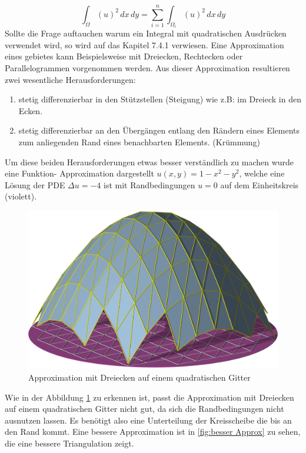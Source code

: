 \begin{equation}
\int_{\Omega} (u)^2 \, dx \, dy = \sum \limits_{i=1}^n \int_{\Omega_i} (u)^2 \, dx \, dy 
\label{fem:equationSummGebiete}
\end{equation}
Sollte die Frage auftauchen warum ein Integral mit quadratischen Ausdrücken verwendet wird, so wird auf das Kapitel 7.4.1 verwiesen. Eine Approximation eines gebietes kann Beispielsweise mit Dreiecken, Rechtecken oder Parallelogrammen vorgenommen werden. Aus dieser Approximation resultieren zwei wesentliche Herausforderungen:
\begin{enumerate}
	\item stetig differenzierbar in den Stützstellen (Steigung) wie z.B: im Dreieck in den Ecken.
	\item stetig differenzierbar an den Übergängen entlang den Rändern eines Elements zum anliegenden Rand eines benachbarten Elements. (Krümmung)
\end{enumerate}
Um diese beiden Herausforderungen etwas besser verständlich zu machen wurde  eine Funktion- Approximation dargestellt  $u(x,y) = 1-x^2-y^2$, welche eine Lösung der PDE $\Delta u = -4$ ist mit Randbedingungen $u=0$ auf dem Einheitskreis (violett).
\begin{figure}[h]
	\centering
	\includegraphics[scale=0.8]{papers/fem/Images/ansatz.jpg}
	\caption{Approximation mit Dreiecken auf einem quadratischen Gitter }
	\label{fig:Ansatz}
\end{figure}
Wie in der Abbildung \ref{fig:Ansatz} zu erkennen ist, passt die Approximation mit Dreiecken auf einem quadratischen Gitter nicht gut, da sich die Randbedingungen nicht ausnutzen lassen. Es benötigt also eine Unterteilung der Kreisscheibe die bis an den Rand kommt. Eine bessere Approximation ist in \ref{fig:besser Approx} zu sehen, die eine bessere Triangulation zeigt.
